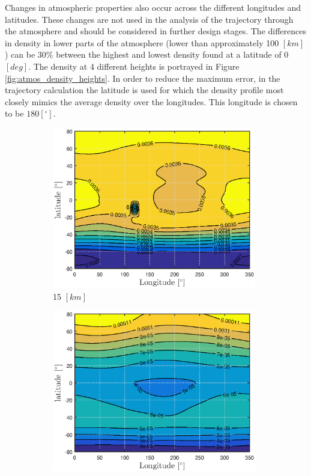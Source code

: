Changes in atmospheric properties also occur across the different longitudes and latitudes. These changes are not used in the analysis of the trajectory through the atmosphere and should be considered in further design stages. The differences in density in lower parts of the atmosphere (lower than approximately 100 $[km]$) can be $30\%$ between the highest and lowest density found at a latitude of 0 $[deg]$. The density at 4 different heights is portrayed in Figure \ref{fig:atmos_density_heights}. In order to reduce the maximum error, in the trajectory calculation the latitude is used for which the density profile most closely mimics the average density over the longitudes. This longitude is chosen to be $180 \left[^\circ\right]$.


\begin{figure}[h]
	\centering
	\begin{subfigure}{0.49\textwidth}
		\centering
		\includegraphics[width=0.98\textwidth]{Figure/Atmosphere/density_15km.eps}
		\caption{15 $[km]$} 
		\label{fig:atmos_rho_15km}
	\end{subfigure}
	\begin{subfigure}{0.49\textwidth}
		\centering
		\includegraphics[width=0.98\textwidth]{Figure/Atmosphere/density_50km.eps}

\end{subfigure}
\end{figure}
